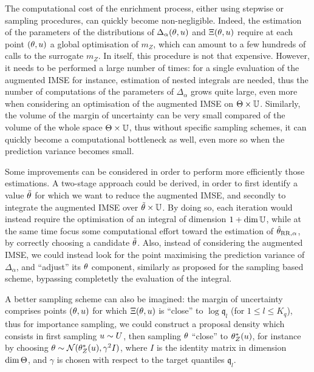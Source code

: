 \documentclass[../../Main_ManuscritThese.tex]{subfiles}
\begin{document}
The computational cost of the enrichment process, either using
stepwise or sampling procedures, can quickly become
non-negligible. Indeed, the estimation of the parameters of the
distributions of $\Delta_{\alpha}(\theta, u)$ and $\Xi(\theta, u)$
require at each point $(\theta, u)$ a global optimisation of $m_Z$,
which can amount to a few hundreds of calls to the surrogate $m_Z$.
In itself, this procedure is not that expensive. However, it needs to
be performed a large number of times: for a single evaluation of the
augmented IMSE for instance, estimation of nested integrals are
needed, thus the number of computations of the parameters of
$\Delta_{\alpha}$ grows quite large, even more when considering an
optimisation of the augmented IMSE on $\Theta
\times\mathbb{U}$. Similarly, the volume of the margin of uncertainty can
be very small compared of the volume of the whole space
$\Theta \times \mathbb{U}$, thus without specific sampling schemes, it
can quickly become a computational bottleneck as well, even more so
when the prediction variance becomes small.

Some improvements can be considered in order to perform more
efficiently those estimations. A two-stage approach could be derived,
in order to first identify a value $\tilde{\theta}$ for which we want to
reduce the augmented IMSE, and secondly to integrate the augmented
IMSE over $\tilde{\theta} \times \mathbb{U}$. By doing so, each iteration
would instead require the optimisation of an integral of dimension
$1 + \dim \mathbb{U}$, while at the same time focus some computational
effort toward the estimation of $\hat{\theta}_{\mathrm{RR},\alpha}$, by
correctly choosing a candidate $\tilde{\theta}$.  Also, instead of
considering the augmented IMSE, we could instead look for the point
maximising the prediction variance of $\Delta_{\alpha}$, and
``adjust'' its $\theta$ component, similarly as proposed for the sampling
based scheme, bypassing completetly the evaluation of the integral.



A better sampling scheme can also be imagined: the margin of
uncertainty comprises points $(\theta, u)$ for which $\Xi(\theta,u)$ is
``close'' to $\log \mathfrak{q}_l$ (for $1\leq l \leq K_q$), thus for
importance sampling, we could construct a proposal density which
consists in first sampling $u \sim U$, then sampling $\theta$
``close'' to $\theta^*_Z(u)$, for instance by choosing
$\theta \sim \mathcal{N}(\theta^*_Z(u), \gamma^2 I)$, where $I$ is the
identity matrix in dimension $\dim \Theta$, and $\gamma$ is chosen
with respect to the target quantiles $\mathfrak{q}_l$.
\end{document}
